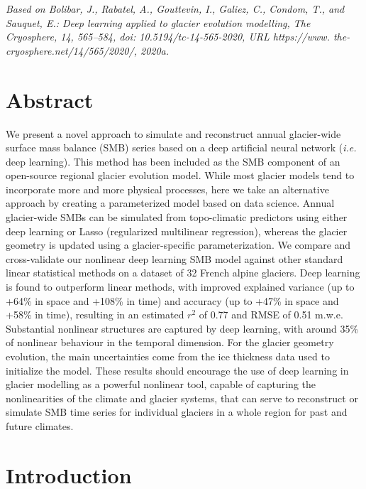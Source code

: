 \textit{Based on Bolibar, J., Rabatel, A., Gouttevin, I., Galiez, C., Condom, T., and Sauquet, E.: Deep learning applied to glacier evolution modelling, The Cryosphere, 14, 565–584, doi: 10.5194/tc-14-565-2020, URL https://www.
the-cryosphere.net/14/565/2020/, 2020a.}

\section{Abstract}
We present a novel approach to simulate and reconstruct annual glacier-wide surface mass balance (SMB) series based on a deep artificial neural network (\textit{i.e.} deep learning). This method has been included as the SMB component of an open-source regional glacier evolution model. While most glacier models tend to incorporate more and more physical processes, here we take an alternative approach by creating a parameterized model based on data science. Annual glacier-wide SMBs can be simulated from topo-climatic predictors using either deep learning or Lasso (regularized multilinear regression), whereas the glacier geometry is updated using a glacier-specific parameterization. We compare and cross-validate our nonlinear deep learning SMB model against other standard linear statistical methods on a dataset of 32 French alpine glaciers. Deep learning is found to outperform linear methods, with improved explained variance (up to +64\% in space and +108\% in time) and accuracy (up to +47\% in space and +58\% in time), resulting in an estimated \(r^2\) of 0.77 and RMSE of 0.51 m.w.e. Substantial nonlinear structures are captured by deep learning, with around 35\% of nonlinear behaviour in the temporal dimension. For the glacier geometry evolution, the main uncertainties come from the ice thickness data used to initialize the model. These results should encourage the use of deep learning in glacier modelling as a powerful nonlinear tool, capable of capturing the nonlinearities of the climate and glacier systems, that can serve to reconstruct or simulate SMB time series for individual glaciers in a whole region for past and future climates. 


\section{Introduction} \label{methods:intro}

